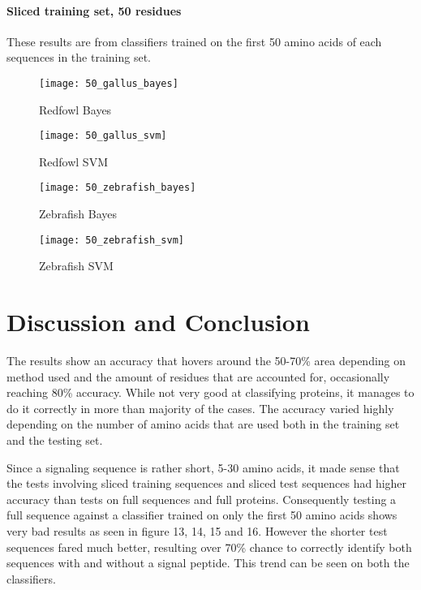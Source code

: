 \documentclass[10pt,letterpaper]{article}
\begin{document}
\newpage

\paragraph*{Sliced training set, 50 residues} These results are from classifiers trained on the first 50 amino acids of each sequences in the training set. 
\begin{figure}[H] 
  \label{fig7} 
  \begin{minipage}[b]{0.6\linewidth}
    \texttt{[image: 50\_gallus\_bayes]} 
    \caption{Redfowl Bayes} 
    \vspace{4ex}
  \end{minipage}%
  \begin{minipage}[b]{0.6\linewidth}
    \texttt{[image: 50\_gallus\_svm]} 
    \caption{Redfowl SVM} 
    \vspace{4ex}
  \end{minipage} 
  \begin{minipage}[b]{0.6\linewidth}
    \texttt{[image: 50\_zebrafish\_bayes]} 
    \caption{Zebrafish Bayes} 
    \vspace{4ex}
  \end{minipage}%
  \begin{minipage}[b]{0.6\linewidth}
    \texttt{[image: 50\_zebrafish\_svm]} 
    \caption{Zebrafish SVM} 
    \vspace{4ex}
  \end{minipage} 
\end{figure}


\section*{Discussion and Conclusion}
The results show an accuracy that hovers around the 50-70\% area depending on method used and the amount of residues that are accounted for, occasionally reaching 80\% accuracy. While not very good at classifying proteins, it manages to do it correctly in more than majority of the cases. The accuracy varied highly depending on the number of amino acids that are used both in the training set and the testing set. 

Since a signaling sequence is rather short, 5-30 amino acids, it made sense that the tests involving sliced training sequences and sliced test sequences had higher accuracy than tests on full sequences and full proteins. Consequently testing a full sequence against a classifier trained on only the first 50 amino acids shows very bad results as seen in figure 13, 14, 15 and 16. However the shorter test sequences fared much better, resulting over 70\% chance to correctly identify both sequences with and without a signal peptide. This trend can be seen on both the classifiers. 
\end{document}
